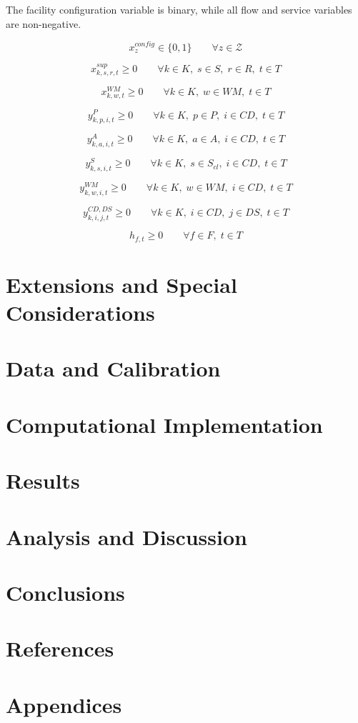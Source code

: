 \documentclass[12pt]{article}
\begin{document}
The facility configuration variable is binary, while all flow and service variables are non-negative.

\[
x^{config}_z \in \{0,1\}
\qquad \forall z \in \mathcal{Z}
\]

\[
x^{sup}_{k,s,r,t} \geq 0
\qquad \forall k \in K,\; s \in S,\; r \in R,\; t \in T
\]

\[
x^{WM}_{k,w,t} \geq 0
\qquad \forall k \in K,\; w \in WM,\; t \in T
\]

\[
y^{P}_{k,p,i,t} \geq 0
\qquad \forall k \in K,\; p \in P,\; i \in CD,\; t \in T
\]

\[
y^{A}_{k,a,i,t} \geq 0
\qquad \forall k \in K,\; a \in A,\; i \in CD,\; t \in T
\]

\[
y^{S}_{k,s,i,t} \geq 0
\qquad \forall k \in K,\; s \in S_{cl},\; i \in CD,\; t \in T
\]

\[
y^{WM}_{k,w,i,t} \geq 0
\qquad \forall k \in K,\; w \in WM,\; i \in CD,\; t \in T
\]

\[
y^{CD,DS}_{k,i,j,t} \geq 0
\qquad \forall k \in K,\; i \in CD,\; j \in DS,\; t \in T
\]

\[
h_{f,t} \geq 0
\qquad \forall f \in F,\; t \in T
\]

\newpage

\section{Extensions and Special Considerations}
\newpage

\section{Data and Calibration}
\newpage

\section{Computational Implementation}
\newpage

\section{Results}
\newpage

\section{Analysis and Discussion}
\newpage

\section{Conclusions}
\newpage

\section{References}
\newpage

\section{Appendices}
\end{document}
